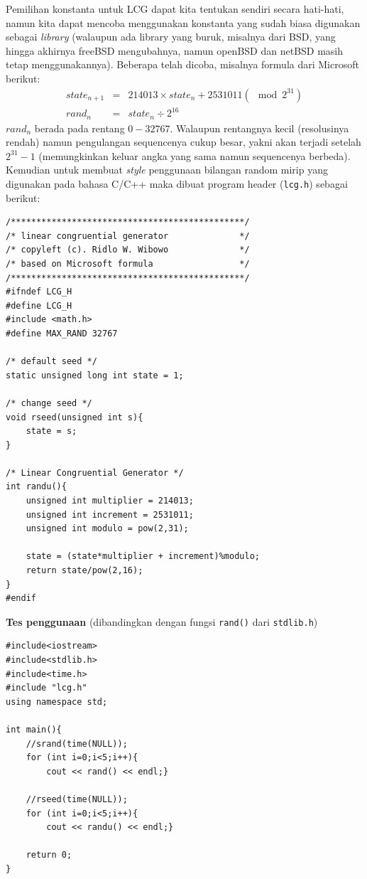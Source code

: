 \documentclass[paper=a4, fontsize=11pt]{scrartcl}
\numberwithin{equation}{section} %
\numberwithin{figure}{section} %
\numberwithin{table}{section} %
\begin{document}
Pemilihan konstanta untuk LCG dapat kita tentukan sendiri secara hati-hati, namun kita dapat mencoba menggunakan konstanta yang sudah biasa digunakan sebagai \textit{library} (walaupun ada library yang buruk, misalnya dari BSD, yang hingga akhirnya freeBSD mengubahnya, namun openBSD dan netBSD masih tetap menggunakannya). Beberapa telah dicoba, misalnya formula dari Microsoft berikut:
\begin{eqnarray*}
state_{n+1} &=& 214013 \times state_{n} + 2531011 (\mod 2^{31})\\
rand_{n} &=& state_{n} \div 2^{16}
\end{eqnarray*}
$rand_{n}$ berada pada rentang $0 - 32767$. Walaupun rentangnya kecil (resolusinya rendah) namun pengulangan sequencenya cukup besar, yakni akan terjadi setelah $2^{31} - 1$ (memungkinkan keluar angka yang sama namun sequencenya berbeda). Kemudian untuk membuat \textit{style} penggunaan bilangan random mirip yang digunakan pada bahasa C/C++ maka dibuat program header (\texttt{lcg.h}) sebagai berikut:
\lstset{frameround=fttt}
\begin{lstlisting}
/**********************************************/
/* linear congruential generator              */
/* copyleft (c). Ridlo W. Wibowo              */
/* based on Microsoft formula                 */
/**********************************************/
#ifndef LCG_H
#define LCG_H
#include <math.h>
#define MAX_RAND 32767

/* default seed */
static unsigned long int state = 1;

/* change seed */
void rseed(unsigned int s){
    state = s;
}
 
/* Linear Congruential Generator */
int randu(){
    unsigned int multiplier = 214013;
    unsigned int increment = 2531011;
    unsigned int modulo = pow(2,31);
    
    state = (state*multiplier + increment)%modulo;
    return state/pow(2,16);
}
#endif
\end{lstlisting}

\textbf{Tes penggunaan} (dibandingkan dengan fungsi \texttt{rand()} dari \texttt{stdlib.h})\\
\lstset{frameround=fttt}
\begin{lstlisting}
#include<iostream>
#include<stdlib.h>
#include<time.h>
#include "lcg.h"
using namespace std;

int main(){
    //srand(time(NULL));
    for (int i=0;i<5;i++){
        cout << rand() << endl;}

    //rseed(time(NULL));
    for (int i=0;i<5;i++){
        cout << randu() << endl;}

    return 0;
}
\end{lstlisting}
\end{document}
